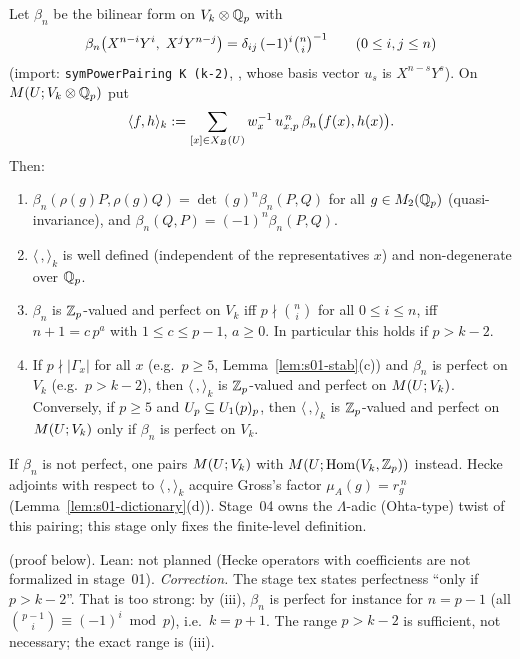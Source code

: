 \begin{definition}\label{def:s01-pairingV}
Let $\beta_n$ be the bilinear form on $V_k\otimes\mathbb{Q}_p$ with
\[\beta_n\big(X^{n-i}Y^i,\;X^{j}Y^{n-j}\big)=\delta_{ij}\,(-1)^i\tbinom ni^{-1}\qquad(0\le i,j\le n)\]
(import: \texttt{symPowerPairing K (k-2)}, , whose basis vector $u_s$ is $X^{n-s}Y^s$). On
$M(U;V_k\otimes\mathbb{Q}_p)$ put
\[\langle f,h\rangle_k:=\sum_{[x]\in X_B(U)}w_x^{-1}\,u_{x,p}^{\,n}\,\beta_n\big(f(x),h(x)\big).\]
Then:
\begin{enumerate}[label=(\roman*)]
\item $\beta_n(\rho(g)P,\rho(g)Q)=\det(g)^n\beta_n(P,Q)$ for all $g\in M_2(\mathbb{Q}_p)$ (quasi-invariance), and
  $\beta_n(Q,P)=(-1)^n\beta_n(P,Q)$.
\item $\langle\,,\rangle_k$ is well defined (independent of the representatives $x$) and non-degenerate over $\mathbb{Q}_p$.
\item $\beta_n$ is $\mathbb{Z}_p$-valued and perfect on $V_k$ iff $p\nmid\binom ni$ for all $0\le i\le n$, iff $n+1=c\,p^a$ with
  $1\le c\le p-1$, $a\ge0$. In particular this holds if $p>k-2$.
\item If $p\nmid|\Gamma_x|$ for all $x$ (e.g.\ $p\ge5$, Lemma~\ref{lem:s01-stab}(c)) and $\beta_n$ is perfect on $V_k$ (e.g.\
  $p>k-2$), then $\langle\,,\rangle_k$ is $\mathbb{Z}_p$-valued and perfect on $M(U;V_k)$. Conversely, if $p\ge5$ and $U_p\subseteq U_1(p)_p$, then
  $\langle\,,\rangle_k$ is $\mathbb{Z}_p$-valued and perfect on $M(U;V_k)$ only if $\beta_n$ is perfect on $V_k$.
\end{enumerate}
If $\beta_n$ is not perfect, one pairs $M(U;V_k)$ with $M(U;\operatorname{Hom}(V_k,\mathbb{Z}_p))$ instead. Hecke adjoints with respect to
$\langle\,,\rangle_k$ acquire Gross's factor $\mu_A(g)=r_g^{\,n}$ (Lemma~\ref{lem:s01-dictionary}(d)). Stage~04 owns the
$\Lambda$-adic (Ohta-type) twist of this pairing; this stage only fixes the finite-level definition.
\end{definition}
\noindent\stproved{} (proof below). Lean: not planned (Hecke operators with coefficients are not formalized in stage~01).
\emph{Correction.} The stage tex states perfectness ``only if $p>k-2$''. That is too strong: by (iii), $\beta_n$ is perfect
for instance for $n=p-1$ (all $\binom{p-1}{i}\equiv(-1)^i\bmod p$), i.e.\ $k=p+1$. The range $p>k-2$ is sufficient, not necessary;
the exact range is (iii).

